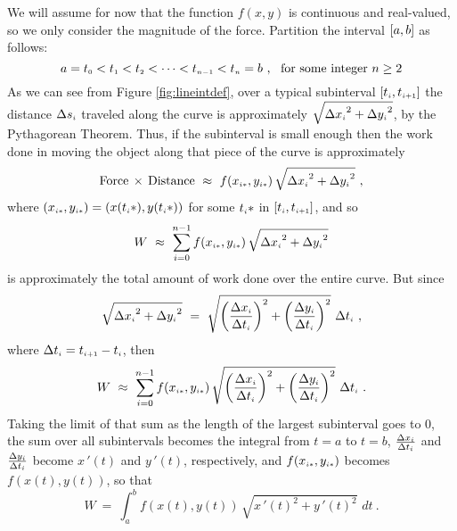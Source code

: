 We will assume for now that the function $f(x,y)$ is continuous and real-valued, so we only consider the magnitude of
the force. Partition the interval $\lbrack a,b \rbrack$ as follows:
\begin{displaymath}
 a = t_{\scriptscriptstyle 0} < t_{\scriptscriptstyle 1} < t_{\scriptscriptstyle 2} < \dots < t_{\scriptscriptstyle n-1} < t_{\scriptscriptstyle n} = b ~,~~\text{for some integer
 $n \ge 2$}
\end{displaymath}
As we can see from Figure \ref{fig:lineintdef}, over a typical subinterval $\lbrack t_{\scriptscriptstyle i},t_{\scriptscriptstyle i+1} \rbrack$ the
distance $\Delta s_{\scriptscriptstyle i}$ traveled along the curve is approximately $\sqrt{{\Delta x_{\scriptscriptstyle i}}^2 +
{\Delta y_{\scriptscriptstyle i}}^2}$, by the Pythagorean Theorem. Thus, if the subinterval is small enough then the work done in
moving the object along that piece of the curve is approximately
\begin{equation}\label{eqn:workapprox}
 \text{Force}\,\times\,\text{Distance} ~\approx~ f(x_{\scriptscriptstyle i*},y_{\scriptscriptstyle i*})\,\sqrt{{\Delta x_{\scriptscriptstyle i}}^2 +
{\Delta y_{\scriptscriptstyle i}}^2} ~,
\end{equation}
where $(x_{\scriptscriptstyle i*},y_{\scriptscriptstyle i*}) = (x(t_{\scriptscriptstyle i}*),y(t_{\scriptscriptstyle i}*))$ for some $t_{\scriptscriptstyle i}*$ in
$\lbrack t_{\scriptscriptstyle i},t_{\scriptscriptstyle i+1} \rbrack$, and so
\begin{equation}\label{eqn:totworkapprox}
 W ~\approx~ \sum\limits_{i=0}^{n-1} f(x_{\scriptscriptstyle i*},y_{\scriptscriptstyle i*})\,\sqrt{{\Delta x_{\scriptscriptstyle i}}^2 +
{\Delta y_{\scriptscriptstyle i}}^2}
\end{equation}
is approximately the total amount of work done over the entire curve. But since
\begin{displaymath}
 \sqrt{{\Delta x_{\scriptscriptstyle i}}^2 + {\Delta y_{\scriptscriptstyle i}}^2} ~=~ \sqrt{\left(\frac{\Delta x_{\scriptscriptstyle i}}{\Delta t_{\scriptscriptstyle i}}\right)^2
  + \left(\frac{\Delta y_{\scriptscriptstyle i}}{\Delta t_{\scriptscriptstyle i}}\right)^2} \,\,\Delta t_{\scriptscriptstyle i} ~,
\end{displaymath}
where $\Delta t_{\scriptscriptstyle i} = t_{\scriptscriptstyle i+1}- t_{\scriptscriptstyle i}$, then
\begin{equation}\label{eqn:totworkapprox2}
 W ~\approx~ \sum\limits_{i=0}^{n-1} f(x_{\scriptscriptstyle i*},y_{\scriptscriptstyle i*})\,
 \sqrt{\left(\frac{\Delta x_{\scriptscriptstyle i}}{\Delta t_{\scriptscriptstyle i}}\right)^2
  + \left(\frac{\Delta y_{\scriptscriptstyle i}}{\Delta t_{\scriptscriptstyle i}}\right)^2} \,\,\Delta t_{\scriptscriptstyle i} ~.
\end{equation}
Taking the limit of that sum as the length of the largest subinterval goes to $0$, the sum over all subintervals becomes
the integral from $t=a$ to $t=b$, $\frac{\Delta x_{\scriptscriptstyle i}}{\Delta t_{\scriptscriptstyle i}}$ and
$\frac{\Delta y_{\scriptscriptstyle i}}{\Delta t_{\scriptscriptstyle i}}$ become $x\,'(t)$ and $y\,'(t)$, respectively, and
$f(x_{\scriptscriptstyle i*},y_{\scriptscriptstyle i*})$ becomes $f(x(t),y(t))$, so that
\begin{equation}\label{eqn:workcurvescalar}
 W ~=~ \int_a^b f(x(t),y(t)) \,\sqrt{x\,'(t)^2 + y\,'(t)^2}\,\,dt ~.
\end{equation}

